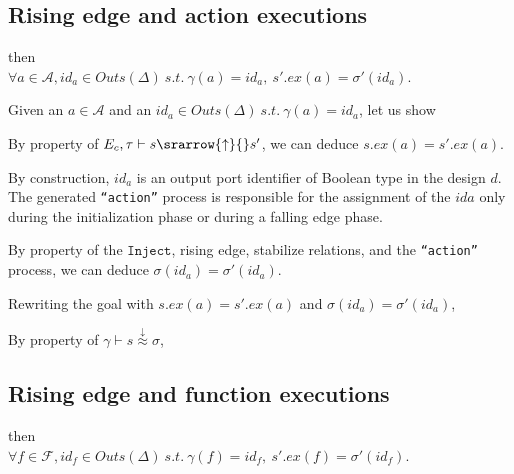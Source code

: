\documentclass[dvipsnames,12pt]{article}
\begin{document}
\subsection{Rising edge and action executions}
\label{sec:re-action-exec}

\begin{lemma}
  \label{lem:re-equal-action-exec}
  \rehyps{} then\\
  $\forall{}a\in\mathcal{A},id_a\in{}Outs(\Delta)~s.t.~\gamma(a)=id_a,~s'.ex(a)=\sigma'(id_a)$.
\end{lemma}

\begin{niproof}
  Given an $a\in\mathcal{A}$ and an
  $id_a\in{}Outs(\Delta)~s.t.~\gamma(a)=id_a$, let us show

  By property of
  $E_c,\tau\vdash{}s\srarrow{\uparrow}{\fontsize{7}{7}\selectfont}s'$,
  we can deduce $s.ex(a)=s'.ex(a)$.
  
  By construction, $id_a$ is an output port identifier of Boolean type
  in the \hvhdl{} design $d$. The generated \texttt{``action''}
  process is responsible for the assignment of the $id a$ only during
  the initialization phase or during a falling edge phase.

  By property of the \hvhdl{} $\mathtt{Inject}$, rising
  edge, stabilize relations, and the \texttt{``action''} process, we
  can deduce $\sigma(id_a)=\sigma'(id_a)$.

  Rewriting the goal with $s.ex(a)=s'.ex(a)$ and
  $\sigma(id_a)=\sigma'(id_a)$, 

  By property of
  $\gamma\vdash{}s\stackrel{\downarrow}{\approx}\sigma$,
\end{niproof}

\subsection{Rising edge and function executions}
\label{sec:re-fun-exec}

\begin{lemma}
  \label{lem:re-equal-fun-exec}
  \rehyps{} then\\
  $\forall{}f\in\mathcal{F},id_f\in{}Outs(\Delta)~s.t.~\gamma(f)=id_f,~s'.ex(f)=\sigma'(id_f)$.
\end{lemma}
\end{document}
